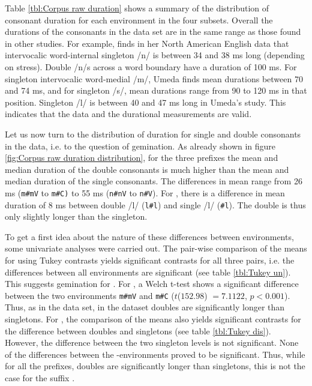 Table \ref{tbl:Corpus raw duration} shows a summary of the distribution of consonant duration for each environment in the four subsets. Overall the durations of the consonants in the data set are in the same range as those found in other studies. For example, \citet[Tables II and X]{Umeda.1977} finds in her North American English data that intervocalic word-internal singleton /n/ is between 34 and 38 ms long (depending on stress). 
Double /n/s across a word boundary have a duration of 100 ms. For singleton intervocalic word-medial /m/, Umeda finds mean durations between 70 and 74 ms, and for singleton /s/, mean durations range from 90 to 120 ms in that position. Singleton /l/ is between 40 and 47 ms long in Umeda's study. This indicates that the data and the durational measurements are valid.

Let us now turn to the distribution of duration for single and double consonants in the data, i.e. to the question of gemination.  As already shown in figure \ref{fig:Corpus raw duration distribution}, for the three prefixes the mean and median duration of the double consonants is much higher than the mean and median duration of the single consonants. The differences in mean range from 26 ms (\texttt{m\#mV} to  \texttt{m\#C)} to 55 ms (\texttt{n\#nV} to  \texttt{n\#V}). For , there is a difference in mean duration of 8 ms between double /l/ (\texttt{l\#l}) and single /l/ (\texttt{\#l}). The double is thus only slightly longer than the singleton.
  
  



To get a first idea about the nature of these differences between environments, some univariate analyses were carried out. The pair-wise comparison of the means for  using Tukey contrasts yields significant contrasts for all three pairs, i.e. the differences between all environments are significant (see table \ref{tbl:Tukey un}). This suggests gemination for . 
For , a Welch t-test shows a significant difference between the two environments \texttt{m\#mV} and \texttt{m\#C} ($t$($152.98$) $=7.1122$, $p< 0.001$). 
Thus, as in the data set, in the dataset doubles are significantly longer than singletons.
For , the comparison of the means also yields significant contrasts for the difference between doubles and singletons (see table \ref{tbl:Tukey dis}). However, the difference between the two singleton levels is not significant. None of the differences between the -environments proved to be significant. Thus, while for all the prefixes, doubles are significantly longer than singletons, this is not the case for the suffix .


